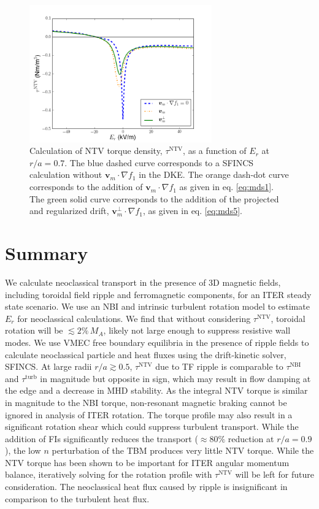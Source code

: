 \documentclass[aip, pop, preprint]{revtex4-1}
\numberwithin{figure}{section}
\numberwithin{equation}{section}
\begin{document}
\begin{figure}[h!]
\centering
\includegraphics[width=0.7\textwidth]{mdscomparison.png}
\caption{\label{fig:driftschemes} Calculation of NTV torque density, $\tau^{\text{NTV}}$, as a function of $E_r$ at $r/a = 0.7$. The blue dashed curve corresponds to a SFINCS calculation without $\bm{v}_m \cdot \nabla f_1$ in the DKE. The orange dash-dot curve corresponds to the addition of $\bm{v}_m \cdot \nabla f_1$ as given in eq. \ref{eq:mds1}. The green solid curve corresponds to the addition of the projected and regularized drift, $\bm{v}^{\perp}_m \cdot \nabla f_1$, as given in eq. \ref{eq:mds5}.}
\end{figure}

\FloatBarrier

\section{Summary}\label{summary}

We calculate neoclassical transport in the presence of 3D magnetic fields, including toroidal field ripple and ferromagnetic components, for an ITER steady state scenario. We use an NBI and intrinsic turbulent rotation model to estimate $E_r$ for neoclassical calculations. We find that without considering $\tau^{\text{NTV}}$, toroidal rotation will be $\lesssim 2\% \,M_A$, likely not large enough to suppress resistive wall modes.\cite{Liu2004} We use VMEC free boundary equilibria in the presence of ripple fields to calculate neoclassical particle and heat fluxes using the drift-kinetic solver, SFINCS. At large radii $r/a \gtrsim 0.5$, $\tau^{\text{NTV}}$ due to TF ripple is comparable to $\tau^{\text{NBI}}$ and $\tau^{\text{turb}}$ in magnitude but opposite in sign, which may result in flow damping at the edge and a decrease in MHD stability. As the integral NTV torque is similar in magnitude to the NBI torque, non-resonant magnetic braking cannot be ignored in analysis of ITER rotation. The torque profile may also result in a significant rotation shear which could suppress turbulent transport. While the addition of FIs significantly reduces the transport ($\approx 80\%$ reduction at $r/a = 0.9$), the low $n$ perturbation of the TBM produces very little NTV torque. While the NTV torque has been shown to be important for ITER angular momentum balance, iteratively solving for the rotation profile with $\tau^{\text{NTV}}$ will be left for future consideration. The neoclassical heat flux caused by ripple is insignificant in comparison to the turbulent heat flux. 
\end{document}
